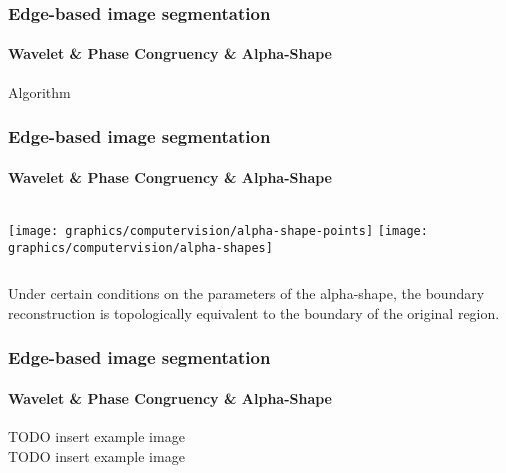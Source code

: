     \begin{frame}
        \frametitle{Edge-based image segmentation}
        \framesubtitle{Wavelet \& Phase Congruency \& Alpha-Shape}
            Algorithm
    \end{frame}

    \begin{frame}
        \frametitle{Edge-based image segmentation}
        \framesubtitle{Wavelet \& Phase Congruency \& Alpha-Shape}
        \begin{columns}[onlytextwidth]
             {
                \texttt{[image: graphics/computervision/alpha-shape-points]}
            }
             {
                \texttt{[image: graphics/computervision/alpha-shapes]}
            }
        \end{columns}
         {
            \begin{theorem}
                Under certain conditions on the parameters of the alpha-shape, the boundary reconstruction is topologically equivalent to the boundary of the original region.
            \end{theorem}
        }
    \end{frame}

    \begin{frame}
        \frametitle{Edge-based image segmentation}
        \framesubtitle{Wavelet \& Phase Congruency \& Alpha-Shape}
        TODO insert example image\\
        TODO insert example image
    \end{frame}